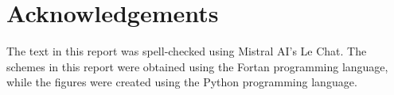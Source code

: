 \appendix
\section{Acknowledgements}
The text in this report was spell-checked using Mistral AI's Le Chat. The schemes in this report were obtained using the Fortan programming language, while the figures were created using the Python programming language. 
